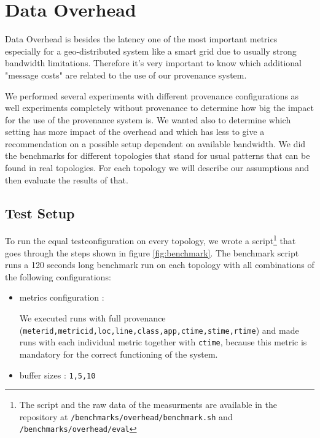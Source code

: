 \section{Data Overhead}
Data Overhead is besides the latency one of the most important metrics especially for a geo-distributed system like a smart grid due to usually strong bandwidth limitations. Therefore it's very important to know which additional "message costs" are related to the use of our provenance system.

We performed several experiments with different provenance configurations as well experiments completely without provenance to determine how big the impact for the use of the provenance system is. We wanted also to determine which setting has more impact of the overhead and which has less to give a recommendation on a possible setup dependent on available bandwidth.
We did the benchmarks for different topologies that stand for usual patterns that can be found in real topologies. For each topology we will describe our assumptions and then evaluate the results of that.

\subsection{Test Setup}
To run the equal testconfiguration on every topology, we wrote a script\footnote{The script and the raw data of the measurments are available in the repository at \texttt{/benchmarks/overhead/benchmark.sh} and \texttt{/benchmarks/overhead/eval}} that goes through the steps shown in figure \ref{fig:benchmark}.
The benchmark script runs a 120 seconds long benchmark run on each topology with all combinations of the following configurations:

\begin{itemize}
\item metrics configuration :

We executed runs with full provenance (\texttt{meterid,metricid,loc,line,class,app,ctime,stime,rtime}) and made runs with each individual metric together with \texttt{ctime}, because this metric is mandatory for the correct functioning of the system.

\item buffer sizes : \texttt{1,5,10}
\end{itemize}

